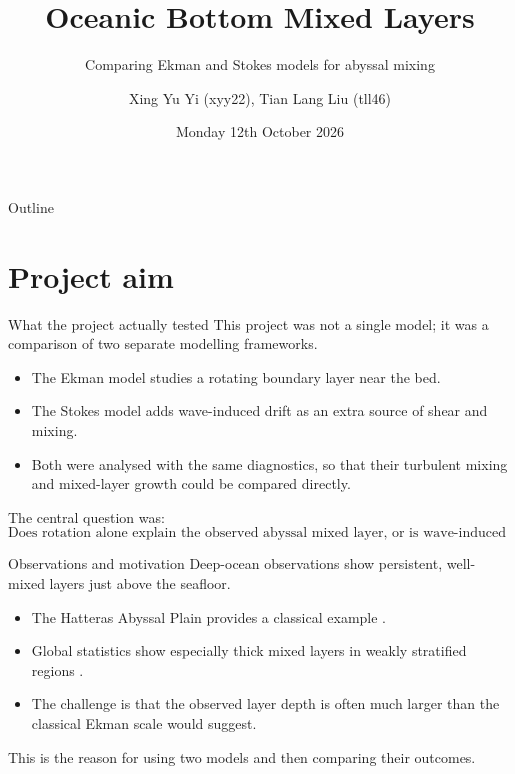 \documentclass[11pt]{beamer}
\title{Oceanic Bottom Mixed Layers}
\subtitle{Comparing Ekman and Stokes models for abyssal mixing}
\author{Xing Yu Yi (xyy22), Tian Lang Liu (tll46)}
\institute[Department of Applied Mathematics and Theoretical Physics]{
    Department of Applied Mathematics and Theoretical Physics \\
    University of Cambridge
}
\date{Monday 12th October 2026}
\begin{document}
\maketitle

\begin{frame}{Outline}
    \tableofcontents
\end{frame}

\section{Project aim}

\begin{frame}{What the project actually tested}
    This project was not a single model; it was a comparison of two separate modelling frameworks.

    \begin{itemize}
        \item The Ekman model studies a rotating boundary layer near the bed.
        \item The Stokes model adds wave-induced drift as an extra source of shear and mixing.
        \item Both were analysed with the same diagnostics, so that their turbulent mixing and mixed-layer growth could be compared directly.
    \end{itemize}

    The central question was:
    \[
    \text{Does rotation alone explain the observed abyssal mixed layer, or is wave-induced forcing essential?}
    \]
\end{frame}

\begin{frame}{Observations and motivation}
    Deep-ocean observations show persistent, well-mixed layers just above the seafloor.

    \begin{itemize}
        \item The Hatteras Abyssal Plain provides a classical example \cite{ArmiMillard76}.
        \item Global statistics show especially thick mixed layers in weakly stratified regions \cite{Huang2019}.
        \item The challenge is that the observed layer depth is often much larger than the classical Ekman scale would suggest.
    \end{itemize}

    This is the reason for using two models and then comparing their outcomes.
\end{frame}
\end{document}
